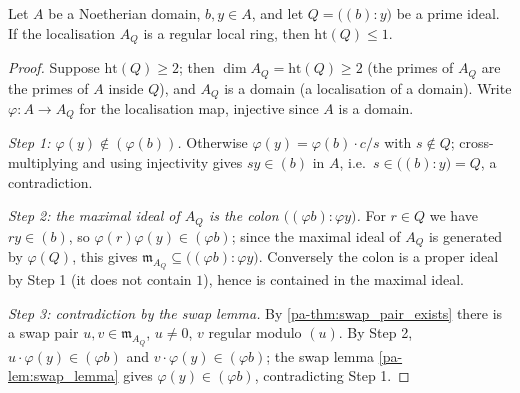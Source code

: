 \begin{theorem}
  \label{pa-thm:colon_height_le_one}
  \leanok

  Let \(A\) be a Noetherian domain, \(b, y \in A\), and let
  \(Q = \bigl((b) : y\bigr)\) be a prime ideal. If the localisation \(A_Q\) is a
  regular local ring, then \(\mathrm{ht}(Q) \leq 1\).
\end{theorem}
\begin{proof}
  \leanok
  Suppose \(\mathrm{ht}(Q) \geq 2\); then \(\dim A_Q = \mathrm{ht}(Q) \geq 2\)
  (the primes of \(A_Q\) are the primes of \(A\) inside \(Q\)), and \(A_Q\) is a
  domain (a localisation of a domain). Write \(\varphi : A \to A_Q\) for the
  localisation map, injective since \(A\) is a domain.

  \emph{Step 1: \(\varphi(y) \notin (\varphi(b))\).} Otherwise
  \(\varphi(y) = \varphi(b) \cdot c/s\) with \(s \notin Q\); cross-multiplying
  and using injectivity gives \(s y \in (b)\) in \(A\), i.e.\
  \(s \in \bigl((b) : y\bigr) = Q\), a contradiction.

  \emph{Step 2: the maximal ideal of \(A_Q\) is the colon
  \(\bigl((\varphi b) : \varphi y\bigr)\).} For \(r \in Q\) we have
  \(r y \in (b)\), so \(\varphi(r) \varphi(y) \in (\varphi b)\); since the
  maximal ideal of \(A_Q\) is generated by \(\varphi(Q)\), this gives
  \(\mathfrak m_{A_Q} \subseteq \bigl((\varphi b) : \varphi y\bigr)\).
  Conversely the colon is a proper ideal by Step 1 (it does not contain \(1\)),
  hence is contained in the maximal ideal.

  \emph{Step 3: contradiction by the swap lemma.} By
  \ref{pa-thm:swap_pair_exists} there is a swap pair
  \(u, v \in \mathfrak m_{A_Q}\), \(u \neq 0\), \(v\) regular modulo \((u)\).
  By Step 2, \(u \cdot \varphi(y) \in (\varphi b)\) and
  \(v \cdot \varphi(y) \in (\varphi b)\); the swap lemma \ref{pa-lem:swap_lemma}
  gives \(\varphi(y) \in (\varphi b)\), contradicting Step 1.
\end{proof}

